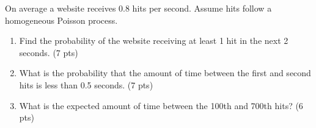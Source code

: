 
\item On average a website receives 0.8 hits per second. Assume hits follow a homogeneous Poisson process.

\begin{enumerate}

\item Find the probability of the website receiving at least 1 hit in the next 2 seconds. (7 pts)

\vfill

\item What is the probability that the amount of time between the first and second hits is less than 0.5 seconds. (7 pts)

\vfill


\item What is the expected amount of time between the 100th and 700th hits? (6 pts)

\vfill
\end{enumerate}
